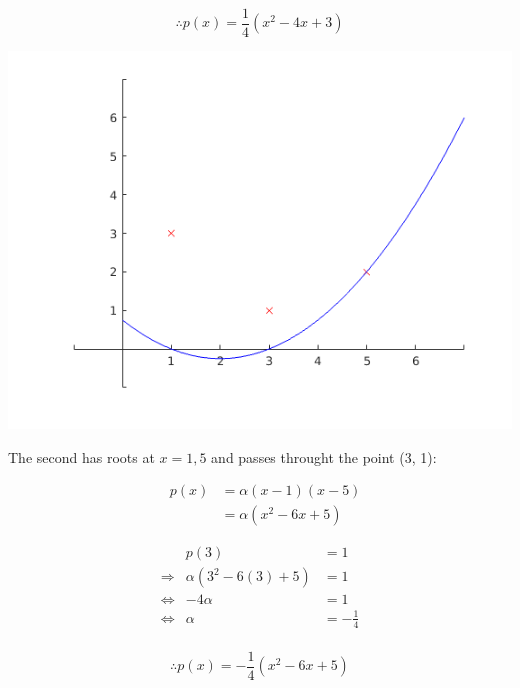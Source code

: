 \documentclass[MathsNotesBase.tex]{subfiles}
\begin{document}
{	\begin{par}
	$$\therefore p(x) = \frac{1}{4}(x^2-4x+3)$$
	\end{par}
	
	
	\begin{center}
	\includegraphics[width=\linewidth]{figure_1.png}
	\end{center}
	
	
	\begin{par}
	\begin{flushleft}
	The second has roots at $x=1,5$ and passes throught the point (3, 1):
	\end{flushleft}
	\end{par}
	
	\begin{par}
	$$\begin{array}{lcr}
	&p(x) &= \alpha(x-1)(x-5)\\
	&&= \alpha(x^2-6x+5)
	\end{array}$$
	\end{par}
	
	\begin{par}
	$$\begin{array}{lcr}
	&p(3)&=1 \\
	\Longrightarrow &\alpha(3^2-6(3) + 5) &= 1 \\
	\iff &-4\alpha&=1\\
	\iff &\alpha &= -\frac{1}{4}\\
	\end{array}$$
	\end{par}
	
	\begin{par}
	$$\therefore p(x) = -\frac{1}{4}(x^2-6x+5)$$
	\end{par}
	
}
\end{document}
